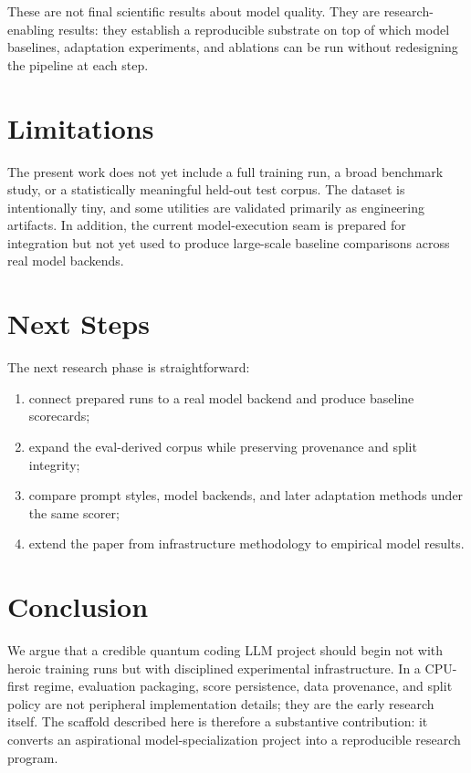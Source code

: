 \documentclass[11pt]{article}
\begin{document}
These are not final scientific results about model quality. They are research-enabling results: they establish a reproducible substrate on top of which model baselines, adaptation experiments, and ablations can be run without redesigning the pipeline at each step.

\section{Limitations}
The present work does not yet include a full training run, a broad benchmark study, or a statistically meaningful held-out test corpus. The dataset is intentionally tiny, and some utilities are validated primarily as engineering artifacts. In addition, the current model-execution seam is prepared for integration but not yet used to produce large-scale baseline comparisons across real model backends.

\section{Next Steps}
The next research phase is straightforward:
\begin{enumerate}[leftmargin=1.5em]
    \item connect prepared runs to a real model backend and produce baseline scorecards;
    \item expand the eval-derived corpus while preserving provenance and split integrity;
    \item compare prompt styles, model backends, and later adaptation methods under the same scorer;
    \item extend the paper from infrastructure methodology to empirical model results.
\end{enumerate}

\section{Conclusion}
We argue that a credible quantum coding LLM project should begin not with heroic training runs but with disciplined experimental infrastructure. In a CPU-first regime, evaluation packaging, score persistence, data provenance, and split policy are not peripheral implementation details; they are the early research itself. The scaffold described here is therefore a substantive contribution: it converts an aspirational model-specialization project into a reproducible research program.
\end{document}

